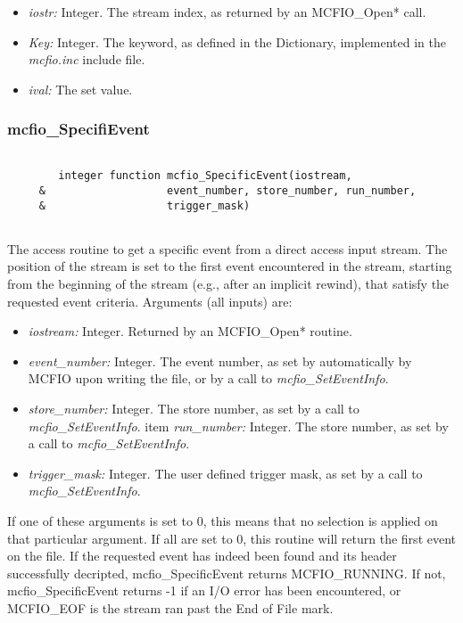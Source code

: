 \begin{itemize}
\item {\em iostr:} Integer. The stream index, as returned by an MCFIO\_Open* 
call.
\item {\em Key:} Integer.  The keyword, as defined in the Dictionary, 
implemented in the {\em mcfio.inc} include file. 
\item {\em ival:} The  set value.
\end{itemize}

\subsubsection{mcfio\_SpecifiEvent}

\begin{verbatim}

        integer function mcfio_SpecificEvent(iostream, 
     &                   event_number, store_number, run_number, 
     &                   trigger_mask)
	
\end{verbatim}
The access routine to get a specific event from a direct access input stream.
The position of the stream is set to the first event encountered in the stream, 
starting from the beginning of the stream (e.g., after an implicit rewind),
that satisfy the requested event criteria. Arguments (all inputs) are:
\begin{itemize}
\item  {\em iostream:} Integer.  Returned by an MCFIO\_Open* routine.
\item {\em event\_number:} Integer. The event number, as set by automatically
by MCFIO upon writing the file, or by a call to {\em  mcfio\_SetEventInfo}.
\item {\em store\_number:} Integer.  The store number, as set 
 by a call to {\em  mcfio\_SetEventInfo}.
item {\em run\_number:} Integer. The store number, as set 
 by a call to {\em  mcfio\_SetEventInfo}.
\item {\em trigger\_mask:} Integer. The user defined trigger mask, as set 
 by a call to {\em  mcfio\_SetEventInfo}.
\end{itemize}

If one of these arguments is set to 0, this means that no selection 
is applied on that particular  argument. If all are set to 0, this 
routine will return the first event on the file. 
If the requested event has indeed been found and its header 
successfully decripted, mcfio\_SpecificEvent returns 
MCFIO\_RUNNING.  If not, mcfio\_SpecificEvent returns -1 if an I/O error has 
been encountered, or MCFIO\_EOF is the stream ran past the 
End of File mark. 

